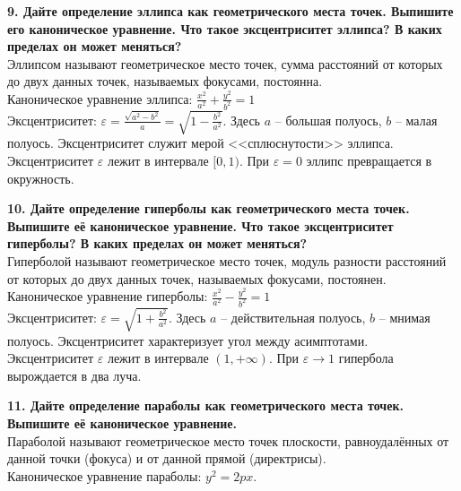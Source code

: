 \documentclass[11pt,a4paper]{article}
\begin{document}
\textbf{9. Дайте определение эллипса как геометрического места точек. Выпишите его каноническое уравнение. Что такое эксцентриситет эллипса? В каких пределах он может меняться?\\}
Эллипсом называют геометрическое место точек, сумма расстояний от которых до двух данных точек, называемых фокусами, постоянна.\\
Каноническое уравнение эллипса: $\frac{x^2}{a^2} + \frac{y^2}{b^2} = 1$\\
Эксцентриситет: $\varepsilon = \frac{\sqrt{a^2 - b^2}}{a} = \sqrt{1 - \frac{b^2}{a^2}}$. Здесь $a$ -- большая полуось, $b$ -- малая полуось. Эксцентриситет служит мерой <<сплюснутости>> эллипса.\\
Эксцентриситет $\varepsilon$ лежит в интервале $[0, 1)$. При $\varepsilon = 0$ эллипс превращается в окружность.

\textbf{10. Дайте определение гиперболы как геометрического места точек. Выпишите её каноническое уравнение. Что такое эксцентриситет гиперболы? В каких пределах он может меняться?\\}
Гиперболой называют геометрическое место точек, модуль разности расстояний от которых до двух данных точек, называемых фокусами, постоянен.\\
Каноническое уравнение гиперболы: $\frac{x^2}{a^2} - \frac{y^2}{b^2} = 1$\\
Эксцентриситет: $\varepsilon = \sqrt{1 + \frac{b^2}{a^2}}$. Здесь $a$ -- действительная полуось, $b$ -- мнимая полуось. Эксцентриситет характеризует угол между асимптотами.\\
Эксцентриситет $\varepsilon$ лежит в интервале $(1, +\infty)$. При $\varepsilon \rightarrow 1$ гипербола вырождается в два луча.

\textbf{11. Дайте определение параболы как геометрического места точек. Выпишите её каноническое уравнение.\\}
Параболой называют геометрическое место точек плоскости, равноудалённых от данной точки (фокуса) и от данной прямой (директрисы).\\
Каноническое уравнение параболы: $y^2 = 2px$.
\end{document}
